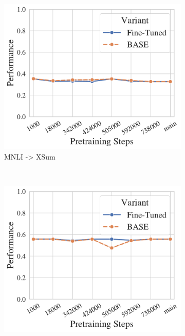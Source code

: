 \begin{figure}[t!]
\begin{subfigure}[b]{0.3\textwidth}
    \end{subfigure}%
    ~ 
    \begin{subfigure}[b]{0.3\textwidth}
    \includegraphics[width=\the\columnwidth]{figures/fig_files/cross-task/sft_evalmnli_matched-trainxsum.pdf}
        \caption{MNLI -> XSum}
    \end{subfigure}%
    \\
    \begin{subfigure}[b]{0.3\textwidth}
    \includegraphics[width=\the\columnwidth]{figures/fig_files/cross-task/sft_evalpaws-trainsocialiqa.pdf}

\end{subfigure}
\end{figure}
